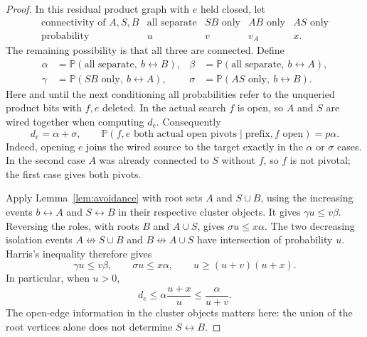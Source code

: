 \documentclass[11pt]{article}
\theoremstyle{definition}
\newcommand{\PP}{\mathbb P}
\begin{document}
\begin{proof}
In this residual product graph with $e$ held closed, let
\[
 \begin{array}{c|cccc}
 \text{connectivity of }A,S,B
 &\text{all separate}&SB\text{ only}&AB\text{ only}&AS\text{ only}\\ \hline
 \text{probability}&u&v&v_A&x.
 \end{array}
\]
The remaining possibility is that all three are connected. Define
\[
 \begin{aligned}
 \alpha&=\PP(\text{all separate},\ b\leftrightarrow B),&
 \beta&=\PP(\text{all separate},\ b\leftrightarrow A),\\
 \gamma&=\PP(SB\text{ only},\ b\leftrightarrow A),&
 \sigma&=\PP(AS\text{ only},\ b\leftrightarrow B).
 \end{aligned}
\]
Here and until the next conditioning all probabilities refer to the
unqueried product bits with $f,e$ deleted. In the actual search $f$
is open, so $A$ and $S$ are wired together when computing $d_e$.
Consequently
\begin{equation}\label{eq:dfs-partition-pivots}
 d_e=\alpha+\sigma,
 \qquad
 \PP(f,e\text{ both actual open pivots}\mid\text{prefix},f\text{ open})
 =p\alpha.
\end{equation}
Indeed, opening $e$ joins the wired source to the target exactly in
the $\alpha$ or $\sigma$ cases. In the second case $A$ was already
connected to $S$ without $f$, so $f$ is not pivotal; the first case
gives both pivots.

Apply Lemma~\ref{lem:avoidance} with root sets $A$ and $S\cup B$,
using the increasing events $b\leftrightarrow A$ and
$S\leftrightarrow B$ in their respective cluster objects. It gives
$\gamma u\le v\beta$. Reversing the roles, with roots $B$ and
$A\cup S$, gives $\sigma u\le x\alpha$. The two decreasing isolation
events $A\not\leftrightarrow S\cup B$ and
$B\not\leftrightarrow A\cup S$ have intersection of probability $u$.
Harris's inequality therefore gives
\begin{equation}\label{eq:dfs-isolation-inequalities}
 \gamma u\le v\beta,
 \qquad \sigma u\le x\alpha,
 \qquad u\ge(u+v)(u+x).
\end{equation}
In particular, when $u>0$,
\begin{equation}\label{eq:dfs-pivotal-comparison}
 d_e\le\alpha\frac{u+x}{u}\le\frac\alpha{u+v}.
\end{equation}
The open-edge information in the cluster objects matters here:
the union of the root vertices alone does not determine
$S\leftrightarrow B$.


\end{proof}
\end{document}
